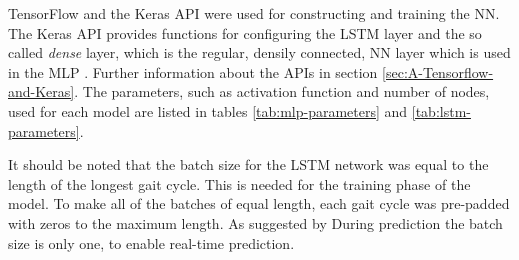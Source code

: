 \documentclass[../main.tex]{subfiles}
\begin{document}
TensorFlow \cite{tensorflow2015-whitepaper} and the Keras API \cite{chollet2015keras} were used for constructing and training the \ac{NN}.
The Keras API provides functions for configuring the \ac{LSTM} layer and the so called \textit{dense} layer, which is the regular, densily connected, \ac{NN} layer which is used in the \ac{MLP} \cite{chollet2015keras}.
Further information about the APIs in section \ref{sec:A-Tensorflow-and-Keras}.
The parameters, such as activation function and number of nodes, used for each model are listed in tables \ref{tab:mlp-parameters} and \ref{tab:lstm-parameters}.

It should be noted that the batch size for the \ac{LSTM} network was equal to the length of the longest gait cycle.
This is needed for the training phase of the model.
To make all of the batches of equal length, each gait cycle was pre-padded with zeros to the maximum length.
As suggested by 
During prediction the batch size is only one, to enable real-time prediction.
\end{document}
